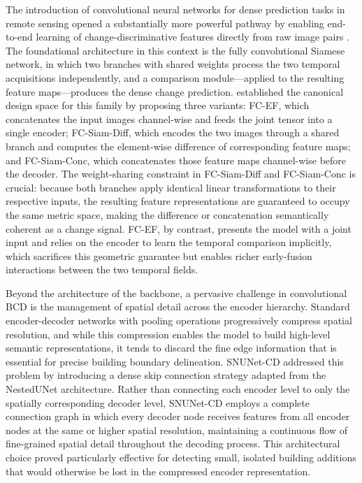 The introduction of convolutional neural networks for dense prediction tasks
in remote sensing opened a substantially more powerful pathway by enabling
end-to-end learning of change-discriminative features directly from raw image
pairs \cite{Shafique2022Review}. The foundational architecture in this context
is the fully convolutional Siamese network, in which two branches with shared
weights process the two temporal acquisitions independently, and a comparison
module---applied to the resulting feature maps---produces the dense change
prediction. \cite{Daudt2018SiamICIP} established the canonical design space
for this family by proposing three variants: FC-EF, which concatenates the
input images channel-wise and feeds the joint tensor into a single encoder;
FC-Siam-Diff, which encodes the two images through a shared branch and
computes the element-wise difference of corresponding feature maps; and
FC-Siam-Conc, which concatenates those feature maps channel-wise before the
decoder. The weight-sharing constraint in FC-Siam-Diff and FC-Siam-Conc is
crucial: because both branches apply identical linear transformations to their
respective inputs, the resulting feature representations are guaranteed to
occupy the same metric space, making the difference or concatenation
semantically coherent as a change signal. FC-EF, by contrast, presents the
model with a joint input and relies on the encoder to learn the temporal
comparison implicitly, which sacrifices this geometric guarantee but enables
richer early-fusion interactions between the two temporal fields.

Beyond the architecture of the backbone, a pervasive challenge in convolutional
BCD is the management of spatial detail across the encoder hierarchy. Standard
encoder-decoder networks with pooling operations progressively compress spatial
resolution, and while this compression enables the model to build high-level
semantic representations, it tends to discard the fine edge information that
is essential for precise building boundary delineation. SNUNet-CD
\cite{Fang2021SNUNetCD} addressed this problem by introducing a dense skip
connection strategy adapted from the NestedUNet architecture. Rather than
connecting each encoder level to only the spatially corresponding decoder
level, SNUNet-CD employs a complete connection graph in which every decoder
node receives features from all encoder nodes at the same or higher spatial
resolution, maintaining a continuous flow of fine-grained spatial detail
throughout the decoding process. This architectural choice proved particularly
effective for detecting small, isolated building additions that would otherwise
be lost in the compressed encoder representation.

